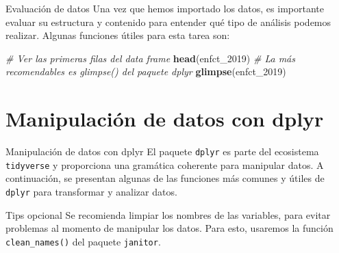 \documentclass[
  ignorenonframetext,
]{beamer}
\newenvironment{Shaded}{\begin{snugshade}}{\end{snugshade}}
\newcommand{\CommentTok}[1]{\textcolor[rgb]{0.56,0.35,0.01}{\textit{#1}}}
\newcommand{\FunctionTok}[1]{\textcolor[rgb]{0.13,0.29,0.53}{\textbf{#1}}}
\newcommand{\NormalTok}[1]{#1}
\begin{document}
\begin{frame}[fragile]{Evaluación de datos}
\label{evaluaciuxf3n-de-datos}
Una vez que hemos importado los datos, es importante evaluar su
estructura y contenido para entender qué tipo de análisis podemos
realizar. Algunas funciones útiles para esta tarea son:

\begin{Shaded}
\begin{Highlighting}[]
\CommentTok{\# Ver las primeras filas del data frame}
\FunctionTok{head}\NormalTok{(enfct\_2019)}
\CommentTok{\# La más recomendables es glimpse() del paquete dplyr}
\FunctionTok{glimpse}\NormalTok{(enfct\_2019)}
\end{Highlighting}
\end{Shaded}
\end{frame}

\section{Manipulación de datos con
dplyr}\label{manipulaciuxf3n-de-datos-con-dplyr}

\begin{frame}[fragile]{Manipulación de datos con dplyr}
\label{manipulaciuxf3n-de-datos-con-dplyr-1}
El paquete \texttt{dplyr} es parte del ecosistema \texttt{tidyverse} y
proporciona una gramática coherente para manipular datos. A
continuación, se presentan algunas de las funciones más comunes y útiles
de \texttt{dplyr} para transformar y analizar datos.

\begin{block}{Tips opcional}
\label{tips-opcional}
Se recomienda limpiar los nombres de las variables, para evitar
problemas al momento de manipular los datos. Para esto, usaremos la
función \texttt{clean\_names()} del paquete \texttt{janitor}.
\end{block}
\end{frame}
\end{document}
